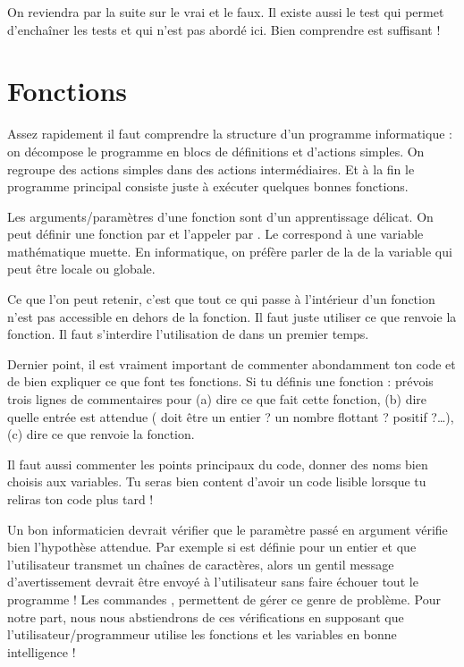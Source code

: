\documentclass[11pt,class=report,crop=false]{standalone}
\begin{document}
On reviendra par la suite sur le \og{}vrai\fg{} et le \og{}faux\fg{}.
Il existe aussi le test  qui permet d'enchaîner les tests et qui n'est pas abordé ici. 
Bien comprendre  est suffisant ! 


\section{Fonctions}

Assez rapidement il faut comprendre la structure d'un programme informatique : on décompose le programme en blocs de définitions et d'actions simples. On regroupe des actions simples dans des actions intermédiaires. Et à la fin le programme principal consiste juste à exécuter quelques bonnes fonctions.

Les arguments/paramètres d'une fonction sont d'un apprentissage délicat.
On peut définir une fonction par  et l'appeler par
. Le  correspond à une variable mathématique muette. 
En informatique, on préfère parler de la  de la variable qui peut être locale ou globale.

Ce que l'on peut retenir, c'est que tout ce qui passe à l'intérieur d'un fonction n'est pas accessible en dehors de la fonction. Il faut juste utiliser ce que renvoie la fonction.
Il faut s’interdire l'utilisation de  dans un premier temps.

Dernier point, il est vraiment important de commenter abondamment ton code et de bien expliquer ce que font tes fonctions. Si tu définis une fonction  : prévois trois lignes de commentaires pour (a) dire ce que fait cette fonction, (b) dire quelle entrée est attendue ( doit être un entier ? un nombre flottant ? positif ?\ldots), (c) dire ce que renvoie la fonction.

Il faut aussi commenter les points principaux du code, donner des noms bien choisis aux variables. Tu seras bien content d'avoir un code lisible lorsque tu reliras ton code plus tard !

Un bon informaticien devrait vérifier que le paramètre passé en argument vérifie bien l'hypothèse attendue. Par exemple si  est définie pour un entier  et que l'utilisateur transmet un chaînes de caractères, alors un gentil message d'avertissement devrait être envoyé à l'utilisateur sans faire échouer tout le programme !
Les commandes ,  permettent de gérer ce genre de problème. 
Pour notre part, nous nous abstiendrons de ces vérifications en supposant que l'utilisateur/programmeur utilise les fonctions et les variables en bonne intelligence !
\end{document}
